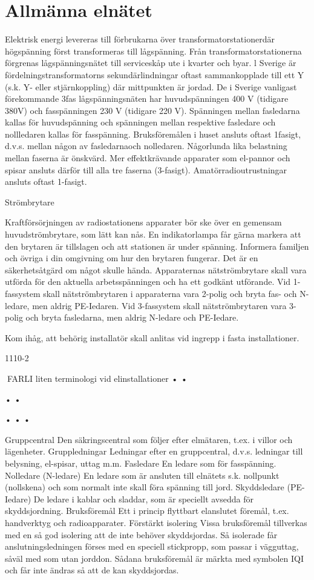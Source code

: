 \documentclass[a4paper,twoside,twocolumn,openright]{book}
\begin{document}
{{{{{\section{Allmänna elnätet}

Elektrisk energi levereras till förbrukarna över
transformatorstationerdär högspänning först
transformeras till lågspänning. Från transformatorstationerna förgrenas lågspänningsnätet till serviceskåp ute i kvarter och byar.
l Sverige är fördelningstransformatorns
sekundärlindningar oftast sammankopplade
till ett Y (s.k. Y- eller stjärnkoppling) där
mittpunkten är jordad.
De i Sverige vanligast förekommande 3fas lågspänningsnäten har huvudspänningen
400 V (tidigare 380V) och fasspänningen
230 V (tidigare 220 V). Spänningen mellan
fasledarna kallas för huvudspänning och
spänningen mellan respektive fasledare och
nollledaren kallas för fasspänning.
Bruksföremålen i huset ansluts oftast 1fasigt, d.v.s. mellan någon av fasledarnaoch
nolledaren. Någorlunda lika belastning mellan faserna är önskvärd. Mer effektkrävande
apparater som el-pannor och spisar ansluts
därför till alla tre faserna (3-fasigt). Amatörradioutrustningar ansluts oftast 1-fasigt.

Strömbrytare

Kraftförsörjningen av radiostationens apparater bör ske över en gemensam huvudströmbrytare, som lätt kan nås. En indikatorlampa får gärna markera att den brytaren är
tillslagen och att stationen är under spänning.
Informera familjen och övriga i din omgivning om hur den brytaren fungerar. Det är en
säkerhetsåtgärd om något skulle hända.
Apparaternas nätströmbrytare skall vara
utförda för den aktuella arbetsspänningen
och ha ett godkänt utförande.
Vid 1-fassystem skall nätströmbrytaren i
apparaterna vara 2-polig och bryta fas- och
N-ledare, men aldrig PE-Iedaren.
Vid 3-fassystem skall nätströmbrytaren
vara 3-polig och bryta fasledarna, men aldrig
N-ledare och PE-Iedare.

Kom ihåg, att behörig installatör skall
anlitas vid ingrepp i fasta installationer.

1110-2

FARLI
liten terminologi vid elinstallationer
•
•

•
•

•
•
•

Gruppcentral
Den säkringscentral som följer efter elmätaren, t.ex. i villor och lägenheter.
Gruppledningar
Ledningar efter en gruppcentral, d.v.s.
ledningar till belysning, el-spisar, uttag
m.m.
Fasledare
En ledare som för fasspänning.
Nolledare (N-ledare)
En ledare som är ansluten till elnätets s.k.
nollpunkt (nollskena) och som normalt
inte skall föra spänning till jord.
Skyddsledare (PE-Iedare)
De ledare i kablar och sladdar, som är
speciellt avsedda för skyddsjordning.
Bruksföremål
Ett i princip flyttbart elanslutet föremål,
t.ex. handverktyg och radioapparater.
Förstärkt isolering
Vissa bruksföremål tillverkas med en så
god isolering att de inte behöver skyddsjordas. Så isolerade får anslutningsledningen förses med en speciell stickpropp,
som passar i vägguttag, såväl med som
utan jorddon. Sådana bruksföremål är
märkta med symbolen IQI och får inte
ändras så att de kan skyddsjordas.

}}}}}
\end{document}
